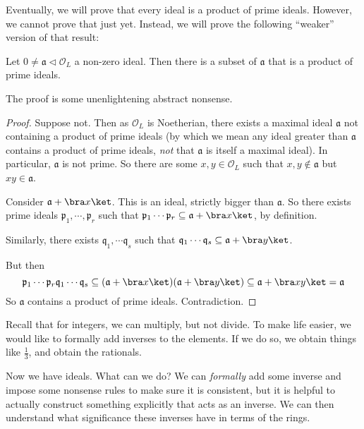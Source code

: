 \documentclass[a4paper]{article}
\begin{document}
Eventually, we will prove that every ideal is a product of prime ideals. However, we cannot prove that just yet. Instead, we will prove the following ``weaker'' version of that result:
\begin{lemma}
  Let $0 \not= \mathfrak{a} \lhd \mathcal{O}_L$ a non-zero ideal. Then there is a subset of $\mathfrak{a}$ that is a product of prime ideals.
\end{lemma}

The proof is some unenlightening abstract nonsense.
\begin{proof}
  Suppose not. Then as $\mathcal{O}_L$ is Noetherian, there exists a maximal ideal $\mathfrak{a}$ not containing a product of prime ideals (by which we mean any ideal greater than $\mathfrak{a}$ contains a product of prime ideals, \emph{not} that $\mathfrak{a}$ is itself a maximal ideal). In particular, $\mathfrak{a}$ is not prime. So there are some $x,y \in \mathcal{O}_L$ such that $x, y \not\in \mathfrak{a}$ but $xy \in \mathfrak{a}$.

  Consider $\mathfrak{a} + \bra x\ket$. This is an ideal, strictly bigger than $\mathfrak{a}$. So there exists prime ideals $\mathfrak{p}_1, \cdots, \mathfrak{p}_r$ such that $\mathfrak{p}_1\cdots \mathfrak{p}_r \subseteq \mathfrak{a} + \bra x\ket$, by definition.

  Similarly, there exists $\mathfrak{q}_1, \cdots\mathfrak{q}_s$ such that $\mathfrak{q}_1 \cdots \mathfrak{q}_s \subseteq \mathfrak{a} + \bra y\ket$.

  But then
  \[
    \mathfrak{p}_1\cdots\mathfrak{p}_r \mathfrak{q}_1\cdots\mathfrak{q}_s \subseteq (\mathfrak{a} + \bra x\ket)(\mathfrak{a} + \bra y\ket) \subseteq \mathfrak{a} + \bra xy\ket = \mathfrak{a}
  \]
  So $\mathfrak{a}$ contains a product of prime ideals. Contradiction.
\end{proof}

Recall that for integers, we can multiply, but not divide. To make life easier, we would like to formally add inverses to the elements. If we do so, we obtain things like $\frac{1}{3}$, and obtain the rationals.

Now we have ideals. What can we do? We can \emph{formally} add some inverse and impose some nonsense rules to make sure it is consistent, but it is helpful to actually construct something explicitly that acts as an inverse. We can then understand what significance these inverses have in terms of the rings.
\end{document}
